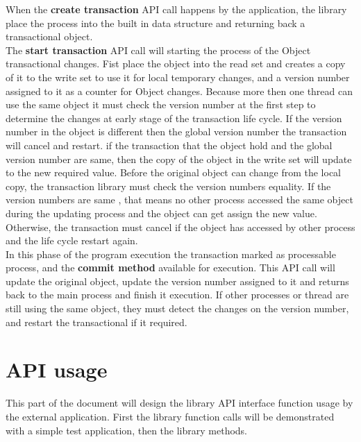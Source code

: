 \documentclass[12pt]{article}
\begin{document}
When the \textbf{create transaction} API call happens by the application, the library place the process into the built in data structure and returning back a transactional object.\\

The \textbf{start transaction} API call will starting the process of the Object transactional changes. Fist place the object into the read set and creates a copy of it to the write set to use it for local temporary changes, and a version number assigned to it as a counter for Object changes. Because more then one thread can use the same object it must check the version number at the first step to determine the changes at early stage of the transaction life cycle. If the version number in the object is different then the global version number the transaction will cancel and restart. if the transaction that the object hold and the global version number are same, then the copy of the object in the write set will update to the new required value. Before the original object can change from the local copy, the transaction library must check the version numbers equality. If the version numbers are same , that means no other process accessed the same object during the updating process and the object can get assign the new value. Otherwise, the transaction must cancel if the object has accessed by other process and the life cycle restart again.\\

In this phase of the program execution the transaction marked as processable process, and the \textbf{commit method} available for execution. This API call will update the original object, update the version number assigned to it and returns back to the main process and finish it execution. If other processes or thread are still using the same object, they must detect the changes on the version number, and restart the transactional if it required.

\newpage
\section{API usage}
This part of the document will design the library API interface function usage by the external application. First the library function calls will be demonstrated with a simple test application, then the library methods.\\
\end{document}
